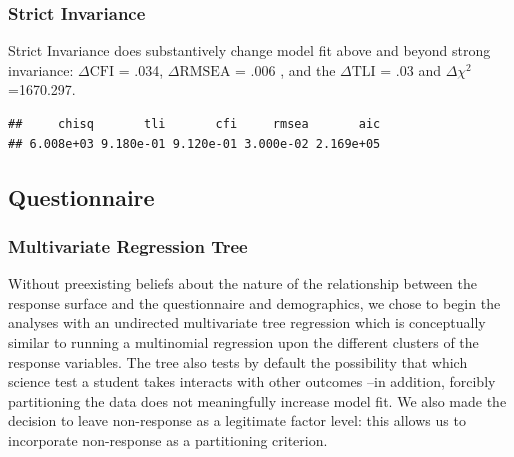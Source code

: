 \documentclass{article}\usepackage[]{graphicx}\usepackage[]{color}
\makeatletter
\newenvironment{kframe}{%
 \def\at@end@of@kframe{}%
 \ifinner\ifhmode%
  \def\at@end@of@kframe{\end{minipage}}%
  \begin{minipage}{\columnwidth}%
 \fi\fi%
 \def\FrameCommand##1{\hskip\@totalleftmargin \hskip-\fboxsep
 \colorbox{shadecolor}{##1}\hskip-\fboxsep
     \hskip-\linewidth \hskip-\@totalleftmargin \hskip\columnwidth}%
 \MakeFramed {\advance\hsize-\width
   \@totalleftmargin\z@ \linewidth\hsize
   \@setminipage}}%
 {\par\unskip\endMakeFramed%
 \at@end@of@kframe}
\newenvironment{knitrout}{}{} %
\makeatother
\begin{document}
\subsubsection*{Strict Invariance}
Strict Invariance does substantively change model fit above and beyond strong invariance: $\Delta\mathrm{CFI}$ = .034, $\Delta\mathrm{RMSEA}$ = .006 , and the $\Delta\mathrm{TLI}$ = .03 and $\Delta$$\chi^2$=1670.297. 
\begin{knitrout}
\color{fgcolor}\begin{kframe}
\begin{verbatim}
##     chisq       tli       cfi     rmsea       aic 
## 6.008e+03 9.180e-01 9.120e-01 3.000e-02 2.169e+05
\end{verbatim}
\end{kframe}
\end{knitrout}


\subsection{Questionnaire}
\subsubsection{Multivariate Regression Tree}
Without preexisting beliefs about the nature of the relationship between the response surface and the questionnaire and demographics, we chose to begin the analyses with an undirected multivariate tree regression \cite{De'ath} which is conceptually similar to running a multinomial regression upon the different clusters of the response variables. The tree also tests by default the possibility that which science test a student takes interacts with other outcomes --in addition, forcibly partitioning the data does not meaningfully increase model fit. We also made the decision to leave non-response as a legitimate factor level: this allows us to incorporate non-response as a partitioning criterion.
\end{document}
